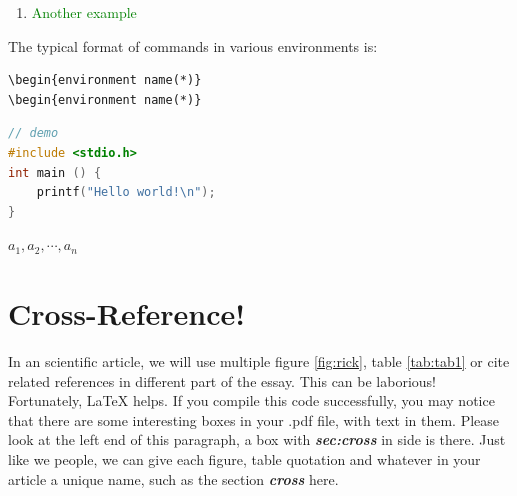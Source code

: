 \documentclass[12pt, letterpaper]{article} %
\begin{document}
\begin{enumerate} %
\item \textcolor{green}{Another example}
\end{enumerate} %

\begin{center} %
The typical format of commands in various environments is: 
\begin{verbatim} 
\begin{environment name(*)}
\begin{environment name(*)}
\end{verbatim} %
\end{center} %

\begin{lstlisting}[language=C++] 
// demo
#include <stdio.h>
int main () {
    printf("Hello world!\n");
}
\end{lstlisting}   %

\newcommand{\myvector}[1]{${#1}_1,{#1}_2,\cdots,{#1}_n$} %
\myvector{a} %



\section{Cross-Reference!} %
\label{sec:cross} %
In an scientific article, we will use multiple figure \ref{fig:rick}, table \ref{tab:tab1} or cite related references 
in different part of the essay. This can be laborious! Fortunately, \LaTeX $ $ helps. If you compile this code 
successfully, you may notice that there are some interesting boxes in your .pdf file, with text in them. Please 
look at the left end of this paragraph, a box with \textsl{\textbf{sec:cross}} in side is there. Just like we people, 
we can give each figure, table quotation and whatever in your article a unique name, such as 
the section \textsl{\textbf{cross}} here. %
\end{document}
